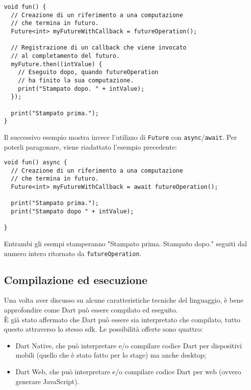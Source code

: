 \begin{lstlisting}
void fun() {
  // Creazione di un riferimento a una computazione
  // che termina in futuro.
  Future<int> myFutureWithCallback = futureOperation();

  // Registrazione di un callback che viene invocato
  // al completamento del futuro.
  myFuture.then((intValue) {
    // Eseguito dopo, quando futureOperation
    // ha finito la sua computazione.
    print("Stampato dopo. " + intValue);
  });

  print("Stampato prima.");
}
\end{lstlisting}
Il successivo esempio mostra invece l'utilizzo di \texttt{Future} con \texttt{async}/\texttt{await}. Per poterli paragonare, viene riadattato l'esempio precedente:
\begin{lstlisting}
void fun() async {
  // Creazione di un riferimento a una computazione
  // che termina in futuro.
  Future<int> myFutureWithCallback = await futureOperation();
    
  print("Stampato prima.");
  print("Stampato dopo " + intValue);

}
\end{lstlisting}
Entrambi gli esempi stamperanno "Stampato prima. Stampato dopo." seguiti dal numero intero ritornato da \texttt{futureOperation}.

\subsection{Compilazione ed esecuzione}
\label{subsec:compilazione-esecuzione}

Una volta aver discusso su alcune caratteristiche tecniche del linguaggio, è bene approfondire come Dart può essere compilato ed eseguito.\\
È già stato affermato che Dart può essere sia interpretato che compilato, tutto questo attraverso lo stesso \gls{sdk}.
Le possibilità offerte sono quattro:
\begin{itemize}
    \item Dart Native, che può interpretare e/o compilare codice Dart per dispositivi mobili (quello che è stato fatto per lo stage) ma anche desktop;
    \item Dart Web, che può interpretare e/o compilare codice Dart per web (ovvero generare JavaScript).
\end{itemize}

